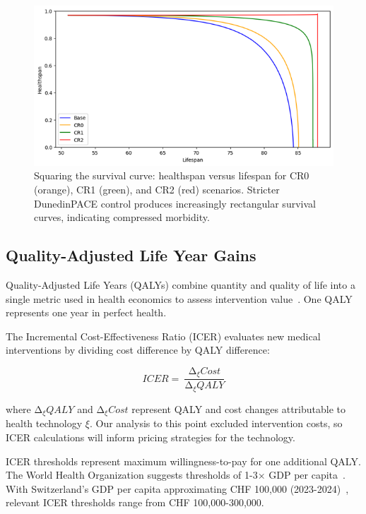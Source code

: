 \begin{figure}[h]
\centering
\small
\includegraphics[width=\textwidth]{figures/Figure9.png}
\caption{Squaring the survival curve: healthspan versus lifespan for CR0 (orange), CR1 (green), and CR2 (red) scenarios. Stricter DunedinPACE control produces increasingly rectangular survival curves, indicating compressed morbidity.}
\label{fig:squaring}
\end{figure}

\subsection{Quality-Adjusted Life Year Gains}

Quality-Adjusted Life Years (QALYs) combine quantity and quality of life into a single metric used in health economics to assess intervention value~\cite{Briggs2023}. One QALY represents one year in perfect health.

The Incremental Cost-Effectiveness Ratio (ICER) evaluates new medical interventions by dividing cost difference by QALY difference:

\begin{equation}\label{eq:icer}
ICER = \ \frac{\mathrm{\Delta}_{\xi}Cost}{\mathrm{\Delta}_{\xi}QALY}
\end{equation}

where $\mathrm{\Delta}_{\xi}QALY$ and $\mathrm{\Delta}_{\xi}Cost$ represent QALY and cost changes attributable to health technology $\xi$. Our analysis to this point excluded intervention costs, so ICER calculations will inform pricing strategies for the technology.

ICER thresholds represent maximum willingness-to-pay for one additional QALY. The World Health Organization suggests thresholds of 1-3× GDP per capita~\cite{Woods2016}. With Switzerland's GDP per capita approximating CHF 100,000 (2023-2024)~\cite{IMF}, relevant ICER thresholds range from CHF 100,000-300,000.

